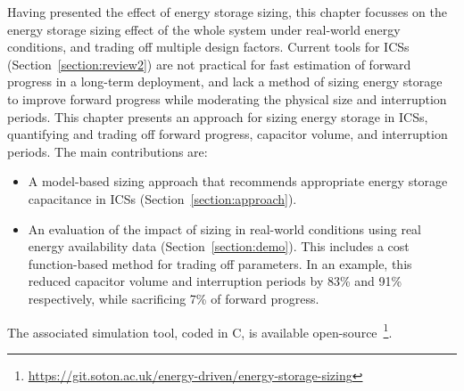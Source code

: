 Having presented the effect of energy storage sizing, this chapter focusses on the energy storage sizing effect of the whole system under real-world energy conditions, and trading off multiple design factors. 
Current tools for ICSs (Section~\ref{section:review2}) are not practical for fast estimation of forward progress in a long-term deployment, and lack a method of sizing energy storage to improve forward progress while moderating the physical size and interruption periods. 
This chapter presents an approach for sizing energy storage in ICSs, quantifying and trading off forward progress, capacitor volume, and interruption periods. 
The main contributions are:
\begin{itemize}
    \item A model-based sizing approach that recommends appropriate energy storage capacitance in ICSs (Section~\ref{section:approach}).
    \item An evaluation of the impact of sizing in real-world conditions using real energy availability data (Section~\ref{section:demo}). 
    This includes a cost function-based method for trading off parameters. 
    In an example, this reduced capacitor volume and interruption periods by 83\% and 91\% respectively, while sacrificing 7\% of forward progress.
\end{itemize}

The associated simulation tool, coded in C, is available open-source~\footnote{\url{https://git.soton.ac.uk/energy-driven/energy-storage-sizing}}. 
